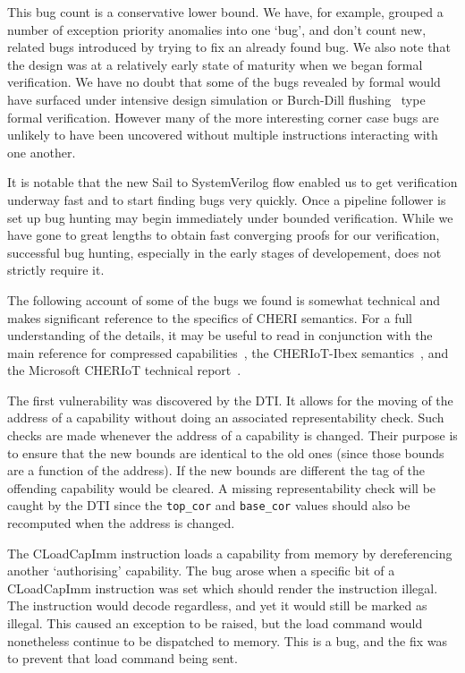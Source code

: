 \documentclass[10pt,conference]{IEEEtran}
\begin{document}
This bug count is a conservative lower bound. We have, for example, grouped
a number of exception priority anomalies into one `bug', and don't count
new, related bugs introduced by trying to fix an already found bug. We also
note that the design was at a relatively early state of maturity when we
began formal verification. We have no doubt that some of the bugs revealed
by formal would have surfaced under intensive design simulation or Burch-Dill
flushing~\cite{10.1007/3-540-58179-0_44} type formal verification. However many
of the more interesting corner case bugs are unlikely to have
been uncovered without multiple instructions interacting with one another.

It is notable that the new Sail to SystemVerilog flow enabled us to get verification underway
fast and to start finding bugs very quickly. Once a pipeline follower is set up
bug hunting may begin immediately under bounded verification. While we have gone to great
lengths to obtain fast converging proofs for our verification, successful bug hunting,
especially in the early stages of developement, does not strictly require it.

The following account of some of the bugs we found is somewhat technical
and makes significant reference to the specifics of CHERI semantics. For a
full understanding of the details, it may be useful to read in conjunction
with the main reference for compressed capabilities~\cite{CHERIConcentrate},
the CHERIoT-Ibex semantics~\cite{cheriot-sail}, and the Microsoft
CHERIoT technical report~\cite{amar2023cheriot}.

The first vulnerability was discovered by the DTI. It allows for the
moving of the address of a capability without doing an associated representability
check. Such checks are made whenever the address of a capability is changed.
Their purpose is to ensure that the new bounds are identical to the old ones (since those
bounds are a function of the address). If the new bounds are different the tag of the offending
capability would be cleared. A missing representability check
will be caught by the DTI since the \verb|top_cor| and \verb|base_cor| values
should also be recomputed when the address is changed.

The CLoadCapImm instruction loads a capability from memory by dereferencing
another `authorising' capability.  The bug arose when a specific bit of a
CLoadCapImm instruction was set which should render the instruction illegal.
The instruction would decode regardless, and yet it would still be marked as illegal.
This caused an exception to be raised, but the load command would nonetheless continue to
be dispatched to memory. This is a bug, and the fix was to prevent that load
command being sent.
\end{document}
